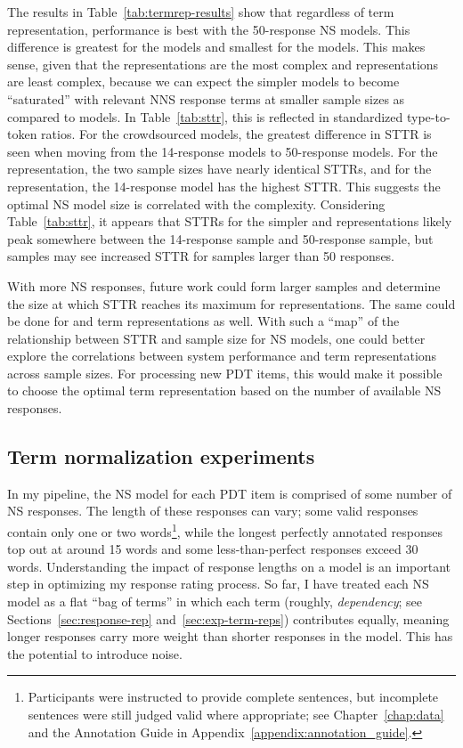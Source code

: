 The results in Table~\ref{tab:termrep-results} show that regardless of term representation, performance is best with the 50-response NS models. This difference is greatest for the  models and smallest for the  models. This makes sense, given that the  representations are the most complex and  representations are least complex, because we can expect the simpler  models to become ``saturated'' with relevant NNS response terms at smaller sample sizes as compared to  models. In Table~\ref{tab:sttr}, this is reflected in standardized type-to-token ratios. For the crowdsourced models, the greatest difference in STTR is seen when moving from the  14-response models to 50-response models. For the  representation, the two sample sizes have nearly identical STTRs, and for the  representation, the 14-response model has the highest STTR. This suggests the optimal NS model size is correlated with the complexity. Considering Table~\ref{tab:sttr}, it appears that STTRs for the simpler  and   representations likely peak somewhere between the 14-response sample and 50-response sample, but  samples may see increased STTR for samples larger than 50 responses.

With more NS responses, future work could form larger samples and determine the size at which STTR reaches its maximum for  representations. The same could be done for  and  term representations as well. With such a ``map'' of the relationship between STTR and sample size for NS models, one could better explore the correlations between system performance and term representations across sample sizes. For processing new PDT items, this would make it possible to choose the optimal term representation based on the number of available NS responses.


\subsection{Term normalization experiments}
\label{sec:exp-term-norm}

In my pipeline, the NS model for each PDT item is comprised of some number of NS responses.  The length of these responses can vary; some valid responses contain only one or two words\footnote{Participants were instructed to provide complete sentences, but incomplete sentences were still judged valid where appropriate; see Chapter~\ref{chap:data} and the Annotation Guide in Appendix~\ref{appendix:annotation_guide}.}, while the longest perfectly annotated responses top out at around 15 words and some less-than-perfect responses exceed 30 words. Understanding the impact of response lengths on a model is an important step in optimizing my response rating process. So far, I have treated each NS model as a flat ``bag of terms'' in which each term (roughly, \textit{dependency}; see Sections~\ref{sec:response-rep} and~\ref{sec:exp-term-reps}) contributes equally, meaning longer responses carry more weight than shorter responses in the model. This has the potential to introduce noise. 

